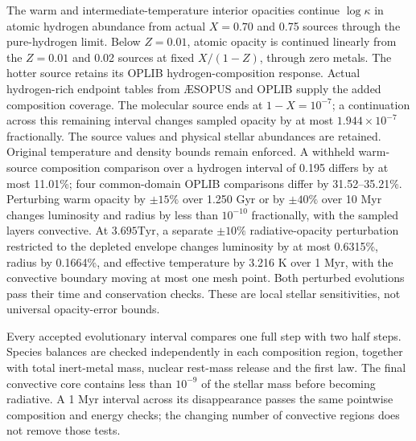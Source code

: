 \documentclass[11pt,letterpaper]{article}
\newcommand{\Tyr}{\mathrm{Tyr}}
\begin{document}
The warm and intermediate-temperature interior opacities continue
$\log\kappa$ in atomic hydrogen abundance from actual $X=0.70$ and
0.75 sources through the pure-hydrogen limit. Below $Z=0.01$,
atomic opacity is continued linearly from the $Z=0.01$ and 0.02 sources
at fixed $X/(1-Z)$, through zero metals. The hotter source retains its
OPLIB hydrogen-composition response. Actual hydrogen-rich endpoint tables
from \AE SOPUS and OPLIB supply the added composition coverage.
The molecular source ends at $1-X=10^{-7}$; a continuation across this
remaining interval changes sampled opacity by at most $1.944\times10^{-7}$
fractionally. The source values and physical stellar abundances are retained.
Original temperature and density bounds
remain enforced. A withheld warm-source composition comparison over a
hydrogen interval of 0.195 differs by at most 11.01\%; four common-domain
OPLIB comparisons differ by 31.52--35.21\%. Perturbing warm opacity by
$\pm15\%$ over 1.250 Gyr or by $\pm40\%$ over 10 Myr changes luminosity
and radius by less than $10^{-10}$ fractionally, with the sampled layers
convective. At $3.695\Tyr$, a separate $\pm10\%$ radiative-opacity
perturbation restricted to the depleted envelope changes luminosity by at
most 0.6315\%, radius by 0.1664\%, and effective temperature by 3.216 K
over 1 Myr, with the convective boundary moving at most one mesh point.
Both perturbed evolutions pass their time and conservation checks.
These are local stellar sensitivities, not universal opacity-error bounds.

Every accepted evolutionary interval compares one full step with two half
steps. Species balances are checked independently in each composition
region, together with total inert-metal mass, nuclear rest-mass release and
the first law. The final convective core contains less than $10^{-9}$ of
the stellar mass before becoming radiative. A 1 Myr interval across its
disappearance passes the same pointwise composition and energy checks;
the changing number of convective regions does not remove those tests.
\end{document}
